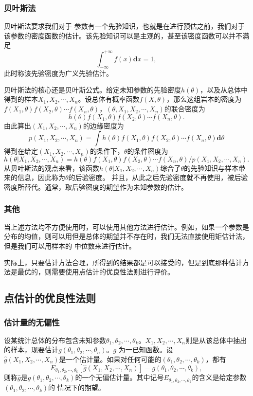 \documentclass[a4paper,11pt]{article}%
\theoremstyle{remark}
\theoremstyle{remark}
\theoremstyle{definition}
\theoremstyle{definition}
\theoremstyle{plain}
\begin{document}
\subsubsection{贝叶斯法}
贝叶斯法要求我们对于 参数有一个先验知识，也就是在进行预估之前，我们对于该参数的密度函数的估计。该先验知识可以是主观的，甚至该密度函数可以并不满足
\[\int_{-\infty}^{+\infty}f(x)\mathbf{d}x=1,\]
此时称该先验密度为广义先验估计。

贝叶斯法的核心还是贝叶斯公式。给定未知参数的先验密度$h(\theta)$，以及从总体中得到的样本$X_1,X_2,\cdots,X_n$。设总体有概率函数$f(X,\theta)$，那么这组岩本的密度为$f(X_1,\theta)f(X_2,\theta)\cdots f(X_n,\theta)$，$(\theta,X_1,X_2,\cdots,X_n      )$的联合密度为
\[h(\theta)f(X_1,\theta)f(X_2,\theta)\cdots f(X_n,\theta).\]
由此算出$(X_1,X_2,\cdots,X_n)$的边缘密度为
\[p(X_1,X_2,\cdots,X_n)=\int h(\theta)f(X_1,\theta)f(X_2,\theta)\cdots f(X_n,\theta)\mathbf{d}\theta\]
得到在给定$(X_1,X_2,\cdots,X_n)$的条件下，$\theta$的条件密度为 
\[h(\theta|X_1,X_2,\cdots,X_n)=h(\theta)f(X_1,\theta)f(X_2,\theta)\cdots f(X_n,\theta)/p(X_1,X_2,\cdots,X_n).\]
从贝叶斯法的观点来看，该函数$h(\theta|X_1,X_2,\cdots,X_n)$综合了$\theta$的先验知识与样本带来的信息，因此称为$\theta$的后验密度。
并且，从此之后先验密度就不再使用，被后验密度所替代。通常，取后验密度的期望作为未知参数的估计。
\subsubsection{其他}
当上述方法均不方便使用时，可以使用其他方法进行估计。例如，如果一个参数是分布的均值，则可以用但是总体的期望并不存在时，我们无法直接使用矩估计法，但是我们可以用样本的
中位数来进行估计。

实际上，只要估计方法合理，所得到的结果都是可以接受的，但是到底那种估计方法是最优的，则需要使用点估计的优良性法则进行评价。
\subsection{点估计的优良性法则}
\subsubsection{估计量的无偏性}
设某统计总体的分布包含未知参数$\theta_1,\theta_2,\cdots,\theta_k$。$X_1,X_2,\cdots,X_n$则是从该总体中抽出的样本，现要估计$g(\theta_1,\theta_2,\cdots,\theta_n)$。$g$
为一已知函数。设\\$\hat{g}(X_1,X_2,\cdots,X_n)$是一个估计量。如果对任何可能的$(\theta_1,\theta_2,\cdots,\theta_k)$，都有
\[E_{\theta_1,\theta_2,\cdots,\theta_k}[\hat{g}(X_1,X_2,\cdots,X_n)]=g(\theta_1,\theta_2,\cdots,\theta_k),\]
则称$\hat{g}$是$g(\theta_1,\theta_2,\cdots,\theta_k)$的一个无偏估计量。其中记号$E_{\theta_1,\theta_2,\cdots,\theta_k}$的含义是给定参数$(\theta_1,\theta_2,\cdots,\theta_k)$的
情况下的期望。
\end{document}
